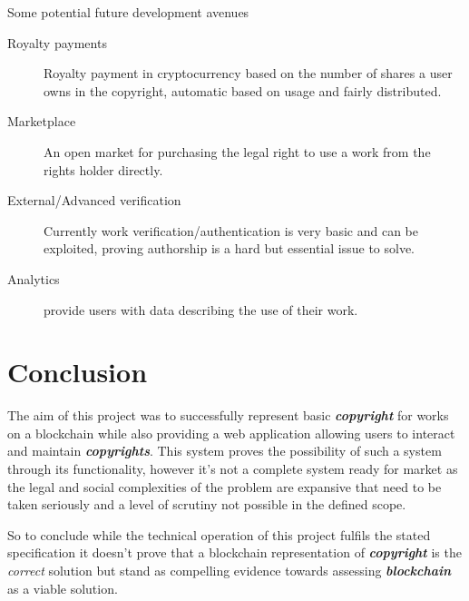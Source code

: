 \documentclass[12pt]{article}
\newcommand{\keyword}[1]{\textbf{\textit{#1}}}
\begin{document}
Some potential future development avenues

\begin{description}
	\item[Royalty payments] Royalty payment in cryptocurrency based on the number of shares a user owns in the copyright, automatic based on usage and fairly distributed.
	\item[Marketplace] An open market for purchasing the legal right to use a work from the rights holder directly.
	\item[External/Advanced verification] Currently work verification/authentication is very basic and can be exploited, proving authorship is a hard but essential issue to solve.
	\item[Analytics] provide users with data describing the use of their work.
\end{description}

\section{Conclusion}

The aim of this project was to successfully represent basic \keyword{copyright} for works on a blockchain while also providing a web application allowing users to interact and maintain \keyword{copyrights}. This system proves the possibility of such a system through its functionality, however it's not a complete system ready for market as the legal and social complexities of the problem are expansive that need to be taken seriously and a level of scrutiny not possible in the defined scope.

So to conclude while the technical operation of this project fulfils the stated specification it doesn't prove that a blockchain representation of \keyword{copyright} is the \textit{correct} solution but stand as compelling evidence towards assessing \keyword{blockchain} as a viable solution.

%



\end{document}
